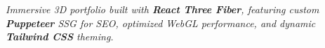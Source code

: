 \nointent
{}

\nointent
\textit{Immersive 3D portfolio built with \textbf{React Three Fiber}, featuring custom \textbf{Puppeteer} SSG for SEO, optimized WebGL performance, and dynamic \textbf{Tailwind CSS} theming.}
